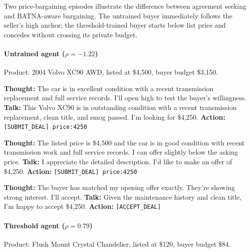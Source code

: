 \documentclass{interact}
\theoremstyle{plain}
\theoremstyle{definition}
\theoremstyle{remark}
\begin{document}
Two price-bargaining episodes illustrate the difference between agreement seeking and BATNA-aware bargaining. The untrained buyer immediately follows the seller's high anchor; the threshold-trained buyer starts below list price and concedes without crossing its private budget.

\paragraph{Untrained agent ($\rho = -1.22$)} Product: 2004 Volvo XC90 AWD, listed at \$4,500, buyer budget \$3,150.

\begin{sellerbox}
\textbf{Thought:} The car is in excellent condition with a recent transmission replacement and full service records. I'll open high to test the buyer's willingness.\newline
\textbf{Talk:} This Volvo XC90 is in outstanding condition with a recent transmission replacement, clean title, and smog passed. I'm looking for \$4,250.\newline
\textbf{Action:} \texttt{[SUBMIT\_DEAL] price:4250}
\end{sellerbox}

\begin{buyerbox}
\textbf{Thought:} The listed price is \$4,500 and the car is in good condition with recent transmission work and full service records. I can offer slightly below the asking price.\newline
\textbf{Talk:} I appreciate the detailed description. I'd like to make an offer of \$4,250.\newline
\textbf{Action:} \texttt{[SUBMIT\_DEAL] price:4250}
\end{buyerbox}

\begin{sellerbox}
\textbf{Thought:} The buyer has matched my opening offer exactly. They're showing strong interest. I'll accept.\newline
\textbf{Talk:} Given the maintenance history and clean title, I'm happy to accept \$4,250.\newline
\textbf{Action:} \texttt{[ACCEPT\_DEAL]}
\end{sellerbox}

\paragraph{Threshold agent ($\rho = 0.79$)} Product: Flush Mount Crystal Chandelier, listed at \$120, buyer budget \$84.
\end{document}
